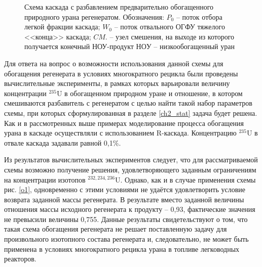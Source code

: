 \begin{figure}[ht]
  \caption{Схема каскада с разбавлением предварительно обогащенного природного урана регенератом. Обозначения: $P_0$ -- поток отбора легкой фракции каскада; $W_0$ -- поток отвального ОГФУ тяжелого <<конца>> каскада; $CM.$ -- узел смешения, на выходе из которого получается конечный НОУ-продукт $НОУ$  -- низкообогащенный уран}\label{o2}
\end{figure}

Для ответа на вопрос о возможности использования данной схемы для обогащения регенерата в условиях многократного рецикла были проведены вычислительные эксперименты, в рамках которых варьировали величину концентрации $^{235}$U в обогащенном природном уране и отношение, в котором смешиваются разбавитель с регенератом с целью найти такой набор параметров схемы, при которых сформулированная в разделе \ref{ch2_stat} задача будет решена. Как и в рассмотренных выше примерах моделирование процесса обогащения урана в каскаде осуществляли с использованием R-каскада. Концентрацию $^{235}$U в отвале каскада задавали равной 0,1\%.

Из результатов вычислительных экспериментов следует, что для рассматриваемой схемы возможно получение решения, удовлетворяющего заданным ограничениям на концентрации изотопов $^{232,234,236}$U. Однако, как и в случае применения схемы рис. \ref{o1}, одновременно с этими условиями не удаётся удовлетворить условие возврата заданной массы регенерата. В результате вместо заданной величины отношения массы исходного регенерата к продукту -- 0,93, фактические значения не превысили величины 0,755. Данные результаты свидетельствуют о том, что такая схема обогащения регенерата не решает поставленную задачу для произвольного изотопного состава регенерата и, следовательно, не может быть применена в условиях многократного рецикла урана в топливе легководных реакторов.

